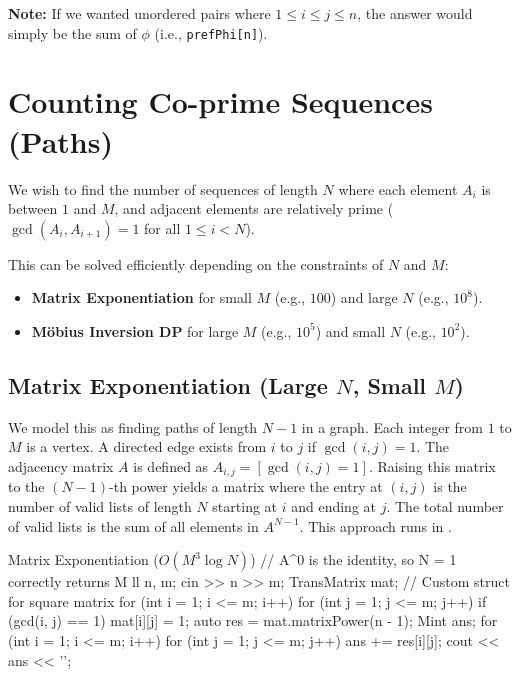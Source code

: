 \documentclass[11pt]{article}
\newcommand{\complexity}[1]{%
  \tcbox[on line, 
    colback=complbg, 
    colframe=compltext!50, 
    boxrule=0.5pt, 
    arc=2pt, 
    boxsep=0pt, 
    left=3pt, right=3pt, top=2pt, bottom=2pt
  ]{\color{compltext}\small\ensuremath{#1}}%
}
\begin{document}
\textbf{Note:} If we wanted unordered pairs where $1 \le i \le j \le n$, the answer would simply be the sum of $\phi$ (i.e., \texttt{prefPhi[n]}).

\pagebreak
\section{Counting Co-prime Sequences (Paths)}
\label{sec:coprime_sequences}

We wish to find the number of sequences of length $N$ where each element $A_i$ is between $1$ and $M$, and adjacent elements are relatively prime ($\gcd(A_i, A_{i+1}) = 1$ for all $1 \le i < N$).

This can be solved efficiently depending on the constraints of $N$ and $M$:
\begin{itemize}
    \item \textbf{Matrix Exponentiation} for small $M$ (e.g., $100$) and large $N$ (e.g., $10^8$).
    \item \textbf{Möbius Inversion DP} for large $M$ (e.g., $10^5$) and small $N$ (e.g., $10^2$).
\end{itemize}

\subsection{Matrix Exponentiation (Large \texorpdfstring{$N$}{N}, Small \texorpdfstring{$M$}{M})}

\begin{derivation}
    We model this as finding paths of length $N-1$ in a graph.
    Each integer from $1$ to $M$ is a vertex. A directed edge exists from $i$ to $j$ if $\gcd(i, j) = 1$.
    The adjacency matrix $A$ is defined as $A_{i,j} = [\gcd(i, j) = 1]$.
    Raising this matrix to the $(N-1)$-th power yields a matrix where the entry at $(i, j)$ is the number of valid lists of length $N$ starting at $i$ and ending at $j$. The total number of valid lists is the sum of all elements in $A^{N-1}$.
    This approach runs in \complexity{O(M^3 \log N)}.
\end{derivation}

\begin{vscode}{Matrix Exponentiation ($O(M^3 \log N)$)}
// A^0 is the identity, so N = 1 correctly returns M
ll n, m;
cin >> n >> m;
TransMatrix mat; // Custom struct for square matrix
for (int i = 1; i <= m; i++)
{
    for (int j = 1; j <= m; j++)
    {
        if (gcd(i, j) == 1)
            mat[i][j] = 1;
    }
}
auto res = mat.matrixPower(n - 1);
Mint ans{};
for (int i = 1; i <= m; i++)
{
    for (int j = 1; j <= m; j++)
        ans += res[i][j];
}
cout << ans << '\n';
\end{vscode}
\end{document}
